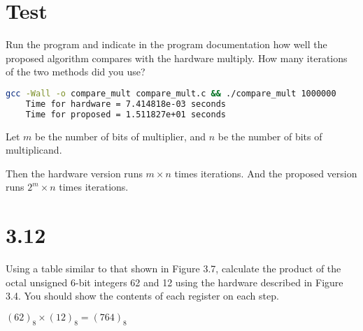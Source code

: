 \documentclass[paper=a4, fontsize=11pt]{scrartcl} %
\begin{document}
\maketitle %

\section{Test}

\begin{fancyquotes}
    Run the program and indicate in the program documentation how well the proposed algorithm compares with the hardware multiply. How many iterations of the two methods did you use?
\end{fancyquotes}

\begin{lstlisting}[language=bash]
    gcc -Wall -o compare_mult compare_mult.c && ./compare_mult 1000000
    Time for hardware = 7.414818e-03 seconds
    Time for proposed = 1.511827e+01 seconds
\end{lstlisting}

Let $m$ be the number of bits of multiplier, and $n$ be the number of bits of multiplicand.

Then the hardware version runs $m\times n$ times iterations.
And the proposed version runs $2^m\times n$ times iterations.

\pagebreak


\section{3.12}

\begin{fancyquotes}
    Using a table similar to that shown in Figure 3.7, calculate the product of the octal unsigned 6-bit integers 62 and 12 using the hardware described in Figure 3.4. You should show the contents of each register on each step.
\end{fancyquotes}

${(62)}_8 \times {(12)}_8 = {(764)}_8$
\end{document}
